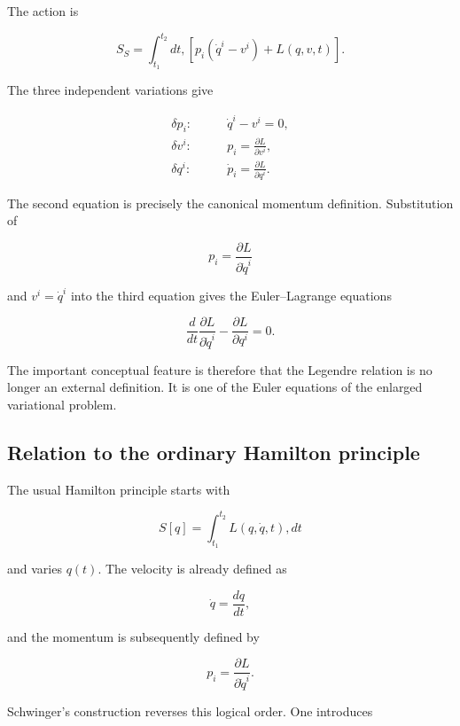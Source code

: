The action is

\begin{equation}
S_S=
\int_{t_1}^{t_2}
dt,
\left[
p_i(\dot q^i-v^i)+L(q,v,t)
\right].
\label{eq:GeneralSchwingerAction}
\end{equation}

The three independent variations give

\begin{align}
\delta p_i:
&\qquad
\dot q^i-v^i=0,
\label{eq:SchwingerGeneral1}\\
\delta v^i:
&\qquad
p_i=\frac{\partial L}{\partial v^i},
\label{eq:SchwingerGeneral2}\\
\delta q^i:
&\qquad
\dot p_i=\frac{\partial L}{\partial q^i}.
\label{eq:SchwingerGeneral3}
\end{align}

The second equation is precisely the canonical momentum definition. Substitution of

$$
p_i=\frac{\partial L}{\partial\dot q^i}
$$

and \(v^i=\dot q^i\) into the third equation gives the Euler--Lagrange equations

\begin{equation}
\boxed{
\frac{d}{dt}
\frac{\partial L}{\partial\dot q^i}-
\frac{\partial L}{\partial q^i}=0.
}
\end{equation}

The important conceptual feature is therefore that the Legendre relation is no longer an external definition. It is one of the Euler equations of the enlarged variational problem.

\subsection{Relation to the ordinary Hamilton principle}

The usual Hamilton principle starts with

\begin{equation}
S[q]=\int_{t_1}^{t_2}L(q,\dot q,t),dt
\end{equation}

and varies \(q(t)\). The velocity is already defined as

$$
\dot q=\frac{dq}{dt},
$$

and the momentum is subsequently defined by

$$
p_i=\frac{\partial L}{\partial\dot q^i}.
$$

Schwinger's construction reverses this logical order. One introduces

